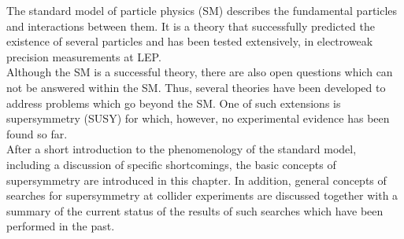 The standard model of particle physics (SM) describes the fundamental particles and interactions between them. It is a theory that successfully predicted the existence of several particles and has been tested extensively, \eg in electroweak precision measurements at LEP. \\
Although the SM is a successful theory, there are also open questions which can not be answered within the SM. Thus, several theories have been developed to address problems which go beyond the SM. One of such extensions is supersymmetry (SUSY) for which, however, no experimental evidence has been found so far. \\
After a short introduction to the phenomenology of the standard model, including a discussion of specific shortcomings, the basic concepts of supersymmetry are introduced in this chapter. In addition, general concepts of searches for supersymmetry at collider experiments are discussed together with a summary of the current status of the results of such searches which have been performed in the past.
